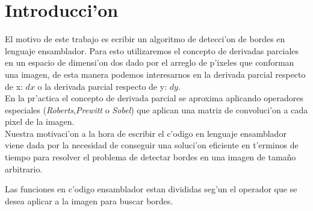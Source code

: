 \documentclass[11pt]{article}
\begin{document}
\section{Introducci'on}
El motivo de este trabajo es ecribir un algoritmo de detecci'on de bordes en lenguaje ensamblador.  Para esto utilizaremos el concepto de derivadas parciales en un espacio de dimensi'on dos dado por el arreglo de p'ixeles que conforman una imagen, de esta manera podemos interesarnos en la derivada parcial respecto de x: $dx$ o la derivada parcial respecto de y: $dy$.\\
En la pr'actica el concepto de derivada parcial se aproxima aplicando operadores especiales (\emph{Roberts},\emph{Prewitt} o \emph{Sobel}) que aplican una matriz de convoluci'on a cada pixel de la imagen.\\
Nuestra motivaci'on a la hora de escribir el c'odigo en lenguaje ensamblador viene dada por la necesidad de conseguir una soluci'on eficiente en t'erminos de tiempo para resolver el problema de detectar bordes en una imagen de tama\~{n}o arbitrario. \\
\begin{center}
\begin{minipage}{11cm}
 Las funciones en c'odigo ensamblador estan divididas seg'un el operador que se desea aplicar a la imagen para buscar bordes.
\end{minipage}
\end{center}
\end{document}
